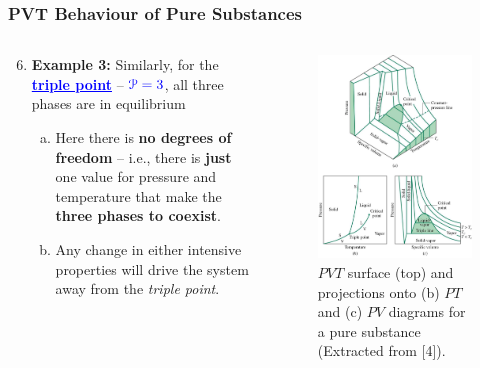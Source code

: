 \documentclass[10pt,compress,handout,ignorenonframetext]{beamer}
\begin{document}
\begin{frame}
 \frametitle{PVT Behaviour of Pure Substances}
 \begin{columns}
    \begin{column}[l]{0.5\linewidth}
      \begin{enumerate}\setcounter{enumi}{5}\scriptsize
         \item <1-> {\bf Example 3:} Similarly, for the \textcolor{blue}{\underline{\bf triple point}} -- $\textcolor{blue}{\mathcal{P}=3}$, all three phases are in equilibrium
           \begin{enumerate}[(a)]\scriptsize
              \item <1-> Here there is {\bf no degrees of freedom} -- i.e., there is {\bf just} one value for pressure and temperature that make the {\bf three phases to coexist}.
              \item <2-> Any change in either intensive properties will drive the system away from the {\it triple point}.
           \end{enumerate}
     \end{enumerate}
  \end{column}
  \begin{column}[l]{0.5\linewidth}
   \begin{figure}%
    \begin{center}
     \includegraphics[width=4.cm,clip]{./Pics/PVT_Surface.jpg}
    \end{center}
    \scriptsize\caption{\scriptsize$PVT$ surface (top) and projections onto (b) $PT$ and (c) $PV$ diagrams for a pure substance (Extracted from [4]).}
   \end{figure}    
  \end{column}
 \end{columns}
\end{frame}
\end{document}
